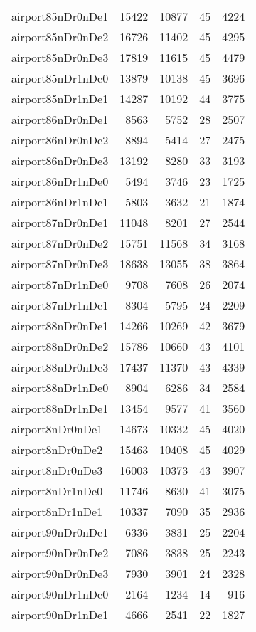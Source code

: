 \begin{longtable}{lrrrr}
airport85nDr0nDe1 & 15422 & 10877 & 45 & 4224 \\
airport85nDr0nDe2 & 16726 & 11402 & 45 & 4295 \\
airport85nDr0nDe3 & 17819 & 11615 & 45 & 4479 \\
airport85nDr1nDe0 & 13879 & 10138 & 45 & 3696 \\
airport85nDr1nDe1 & 14287 & 10192 & 44 & 3775 \\
airport86nDr0nDe1 & 8563 & 5752 & 28 & 2507 \\
airport86nDr0nDe2 & 8894 & 5414 & 27 & 2475 \\
airport86nDr0nDe3 & 13192 & 8280 & 33 & 3193 \\
airport86nDr1nDe0 & 5494 & 3746 & 23 & 1725 \\
airport86nDr1nDe1 & 5803 & 3632 & 21 & 1874 \\
airport87nDr0nDe1 & 11048 & 8201 & 27 & 2544 \\
airport87nDr0nDe2 & 15751 & 11568 & 34 & 3168 \\
airport87nDr0nDe3 & 18638 & 13055 & 38 & 3864 \\
airport87nDr1nDe0 & 9708 & 7608 & 26 & 2074 \\
airport87nDr1nDe1 & 8304 & 5795 & 24 & 2209 \\
airport88nDr0nDe1 & 14266 & 10269 & 42 & 3679 \\
airport88nDr0nDe2 & 15786 & 10660 & 43 & 4101 \\
airport88nDr0nDe3 & 17437 & 11370 & 43 & 4339 \\
airport88nDr1nDe0 & 8904 & 6286 & 34 & 2584 \\
airport88nDr1nDe1 & 13454 & 9577 & 41 & 3560 \\
airport8nDr0nDe1 & 14673 & 10332 & 45 & 4020 \\
airport8nDr0nDe2 & 15463 & 10408 & 45 & 4029 \\
airport8nDr0nDe3 & 16003 & 10373 & 43 & 3907 \\
airport8nDr1nDe0 & 11746 & 8630 & 41 & 3075 \\
airport8nDr1nDe1 & 10337 & 7090 & 35 & 2936 \\
airport90nDr0nDe1 & 6336 & 3831 & 25 & 2204 \\
airport90nDr0nDe2 & 7086 & 3838 & 25 & 2243 \\
airport90nDr0nDe3 & 7930 & 3901 & 24 & 2328 \\
airport90nDr1nDe0 & 2164 & 1234 & 14 & 916 \\
airport90nDr1nDe1 & 4666 & 2541 & 22 & 1827 \\

\end{longtable}
